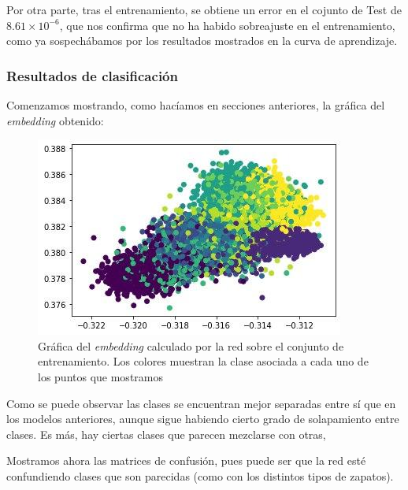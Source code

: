 \documentclass[11pt]{article}
\begin{document}
Por otra parte, tras el entrenamiento, se obtiene un error en el cojunto de Test de $8.61 \times 10^{-6}$, que nos confirma que no ha habido sobreajuste en el entrenamiento, como ya sospechábamos por los resultados mostrados en la curva de aprendizaje.

\subsubsection{Resultados de clasificación}

Comenzamos mostrando, como hacíamos en secciones anteriores, la gráfica del \emph{embedding} obtenido:

\begin{figure}[H]
    \centering
    \includegraphics[width = 0.5 \textwidth]{triples_light_embedding}
    \caption{Gráfica del \emph{embedding} calculado por la red sobre el conjunto de entrenamiento. Los colores muestran la clase asociada a cada uno de los puntos que mostramos}
\end{figure}

Como se puede observar las clases se encuentran mejor separadas entre sí que en los modelos anteriores, aunque sigue habiendo cierto grado de solapamiento entre clases. Es más, hay ciertas clases que parecen mezclarse con otras,

Mostramos ahora las matrices de confusión, pues puede ser que la red esté confundiendo clases que son parecidas (como con los distintos tipos de zapatos).
\end{document}

